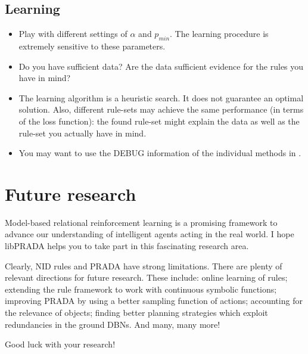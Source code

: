 \documentclass[10pt,twoside,twocolumn,fleqn]{article}
\begin{document}
\subsection{Learning}
\begin{itemize}
\item Play with different settings of $\alpha$ and $p_{min}$. The learning
procedure is extremely sensitive to these parameters.

\item Do you have sufficient data? Are the data sufficient evidence for
the rules you have in mind?

\item The learning algorithm is a heuristic search. It does not guarantee
an optimal solution. Also, different rule-sets may achieve the same
performance (in terms of the loss function): the found rule-set might
explain the data as well as the rule-set you actually have in mind.

\item You may want to use the DEBUG information of the individual methods
in .
\end{itemize}









\section{Future research}

Model-based relational reinforcement learning is a promising framework to
advance our understanding of intelligent agents acting in the real world. I
hope libPRADA helps you to take part in this fascinating research area.

Clearly, NID rules and PRADA have strong limitations. There are plenty of
relevant directions for future research. These include: online learning of
rules; extending the rule framework to work with continuous symbolic
functions; improving PRADA by using a better sampling function of actions;
accounting for the relevance of objects; finding better planning strategies
which exploit redundancies in the ground DBNs. And many, many more!

Good luck with your research!
\end{document}
